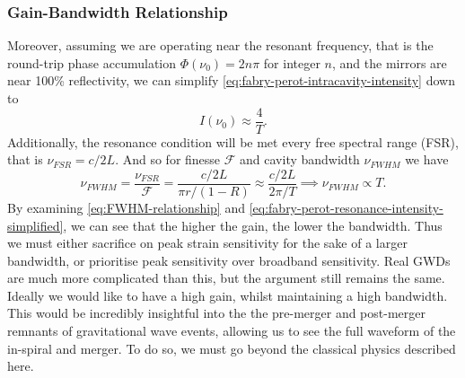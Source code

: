 \documentclass[aps,  
                a4paper, 
                amsmath, 
                amssymb, 
                preprint,
                tightenlines,  
                amsfonts,
                nofootinbib,
                onecolumn,
                titlepage,
                10pt
            ]{revtex4-2}
\begin{document}
    \subsubsection*{Gain-Bandwidth Relationship}
    Moreover, assuming we are operating near the resonant frequency, that is the round-trip phase accumulation $\Phi(\nu_0)= 2n\pi$ for integer $n$, and the mirrors are near 100\% reflectivity, we can simplify \eqref{eq:fabry-perot-intracavity-intensity} down to
    \begin{equation}
        \label{eq:fabry-perot-resonance-intensity-simplified}
        I(\nu_0)\approx\frac{4}{T}.
    \end{equation}
    Additionally, the resonance condition will be met every free spectral range (FSR), that is $\nu_{FSR}=c/2L$. And so for finesse $\mathcal{F}$ and cavity bandwidth $\nu_{FWHM}$ we have
    \begin{equation}
        \label{eq:FWHM-relationship}
        \nu_{FWHM}=\frac{\nu_{FSR}}{\mathcal{F}}=\frac{c/2L}{\pi r/(1-R)}\approx\frac{c/2L}{2\pi/T}\implies\nu_{FWHM}\propto T.
    \end{equation}
    By examining \eqref{eq:FWHM-relationship} and \eqref{eq:fabry-perot-resonance-intensity-simplified}, we can see that the higher the gain, the lower the bandwidth. Thus we must either sacrifice on peak strain sensitivity for the sake of a larger bandwidth, or prioritise peak sensitivity over broadband sensitivity. Real GWDs are much more complicated than this, but the argument still remains the same. Ideally we would like to have a high gain, whilst maintaining a high bandwidth. This would be incredibly insightful into the the pre-merger and post-merger remnants of gravitational wave events, allowing us to see the full waveform of the in-spiral and merger. To do so, we must go beyond the classical physics described here.
\end{document}
